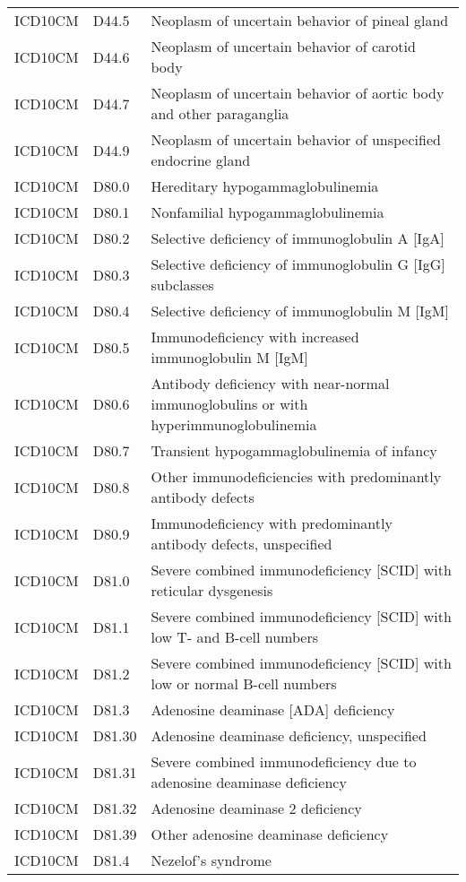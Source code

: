 \begin{longtable}{p{}p{}p{}}
  ICD10CM & D44.5 & Neoplasm of uncertain behavior of pineal gland \\ 
  ICD10CM & D44.6 & Neoplasm of uncertain behavior of carotid body \\ 
  ICD10CM & D44.7 & Neoplasm of uncertain behavior of aortic body and other paraganglia \\ 
  ICD10CM & D44.9 & Neoplasm of uncertain behavior of unspecified endocrine gland \\ 
  ICD10CM & D80.0 & Hereditary hypogammaglobulinemia \\ 
  ICD10CM & D80.1 & Nonfamilial hypogammaglobulinemia \\ 
  ICD10CM & D80.2 & Selective deficiency of immunoglobulin A [IgA] \\ 
  ICD10CM & D80.3 & Selective deficiency of immunoglobulin G [IgG] subclasses \\ 
  ICD10CM & D80.4 & Selective deficiency of immunoglobulin M [IgM] \\ 
  ICD10CM & D80.5 & Immunodeficiency with increased immunoglobulin M [IgM] \\ 
  ICD10CM & D80.6 & Antibody deficiency with near-normal immunoglobulins or with hyperimmunoglobulinemia \\ 
  ICD10CM & D80.7 & Transient hypogammaglobulinemia of infancy \\ 
  ICD10CM & D80.8 & Other immunodeficiencies with predominantly antibody defects \\ 
  ICD10CM & D80.9 & Immunodeficiency with predominantly antibody defects, unspecified \\ 
  ICD10CM & D81.0 & Severe combined immunodeficiency [SCID] with reticular dysgenesis \\ 
  ICD10CM & D81.1 & Severe combined immunodeficiency [SCID] with low T- and B-cell numbers \\ 
  ICD10CM & D81.2 & Severe combined immunodeficiency [SCID] with low or normal B-cell numbers \\ 
  ICD10CM & D81.3 & Adenosine deaminase [ADA] deficiency \\ 
  ICD10CM & D81.30 & Adenosine deaminase deficiency, unspecified \\ 
  ICD10CM & D81.31 & Severe combined immunodeficiency due to adenosine deaminase deficiency \\ 
  ICD10CM & D81.32 & Adenosine deaminase 2 deficiency \\ 
  ICD10CM & D81.39 & Other adenosine deaminase deficiency \\ 
  ICD10CM & D81.4 & Nezelof's syndrome \\ 

\end{longtable}
